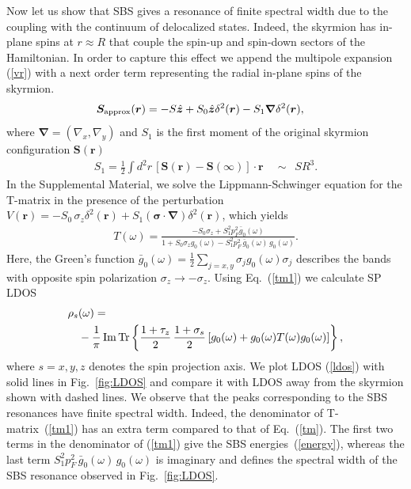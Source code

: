\documentclass[twocolumn,showpacs,floatfix,longbibliography]{revtex4-1}
\begin{document}
Now let us show that SBS gives a resonance of finite spectral width due to the coupling with the continuum of delocalized states. Indeed, the skyrmion has in-plane spins at $r\approx R$ that couple the spin-up and spin-down sectors of the Hamiltonian. In order to capture this effect we append the multipole expansion (\ref{vr}) with a next order term  representing the radial in-plane spins of the skyrmion.
\begin{align}
	\bm S_{\rm approx}(\bm r) & =  - S \hat{\bm z} + S_0 \hat{\bm z} \delta^2(\bm r)-S_1 \bm \nabla \delta^2(\bm r), \label{vr1}
\end{align}
where  $\bm \nabla = (\nabla_x,\nabla_y)$ and $S_1$ is the first moment of the original skyrmion configuration $\bm S(\bm r)$
\begin{align}
	S_1 = \frac{1}{2}\int  d^2r \, \left[\bm S(\bm r)-\bm S(\infty)\right] \cdot \bm r\quad \sim \,\,\,SR^3. \label{S1}
\end{align}
In the Supplemental Material, we solve the Lippmann-Schwinger equation for the T-matrix in the presence of the perturbation $V(\bm r)=-S_0\,\sigma_z\delta^2(\bm r)+S_1 (\bm\sigma\cdot\bm \nabla) \delta^2(\bm r)$, which yields
\begin{align}
	T(\omega) =   \frac{-S_0\sigma_z+S^2_1p_F^2\bar g_{0}(\omega)}{1+S_0\sigma_zg_{0}(\omega)-S^2_1p_F^2\,\bar g_{0}(\omega)\, g_{0}(\omega)}. \label{tm1}
\end{align}
Here, the Green's function $\bar g_0(\omega) = \frac{1}{2}\sum_{j=x,y} \sigma_j g_0(\omega) \sigma_j $ describes the bands with opposite spin polarization ${\sigma_z\rightarrow -\sigma_z}$. Using Eq.~(\ref{tm1}) we calculate SP LDOS
\begin{align}
	\rho_s & (\omega) = \label{ldos} \\
	&-\frac{1}{\pi}\,{\rm Im}{\rm \,Tr} \left\{  \frac{1+\tau_z}{2}\,\frac{1+\sigma_s}{2} \left[g_0(\omega)+g_0(\omega) T(\omega) g_0(\omega)  \right]\right\},\nonumber
\end{align}
where $s=x,y,z$ denotes the spin projection axis. We plot LDOS (\ref{ldos}) with solid lines in Fig.~\ref{fig:LDOS} and compare it with LDOS away from the skyrmion shown with dashed lines. We observe that the peaks corresponding to the SBS resonances have finite spectral width. Indeed, the denominator of T-matrix~(\ref{tm1}) has an extra term compared to that of Eq.~(\ref{tm}). The first two terms in the denominator of (\ref{tm1}) give the SBS energies~(\ref{energy}), whereas the last term $S^2_1p_F^2\,\bar g_{0}(\omega)\, g_{0}(\omega)$ is imaginary and defines the spectral width of the SBS resonance observed in Fig.~\ref{fig:LDOS}.
\end{document}
